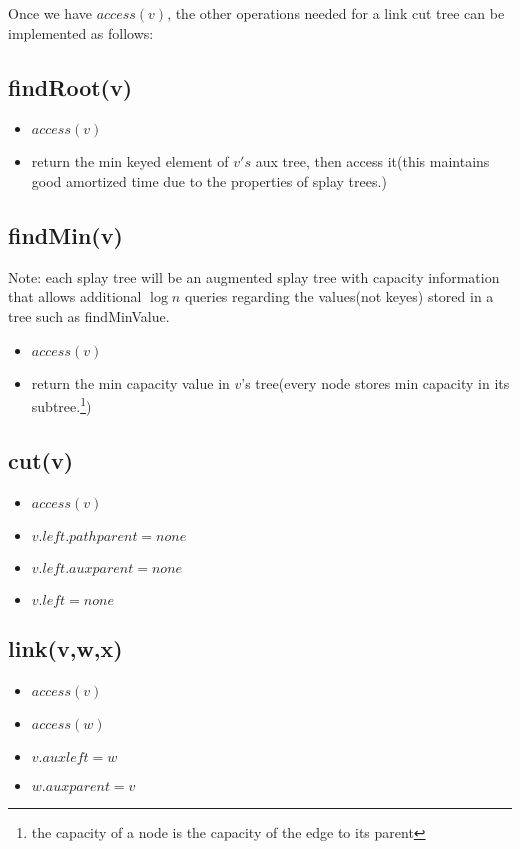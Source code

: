 \documentclass[11pt]{article}
\begin{document}
Once we have $access(v)$, the other operations needed for a link cut tree can be implemented as follows:
\subsection{findRoot(v)}
\begin{itemize}
	\item $access(v)$
	\item return the min keyed element of $v's$ aux tree, then access it(this maintains good amortized time due to the properties of splay trees.)
\end{itemize}


\subsection{findMin(v)}
Note: each splay tree will be an augmented splay tree with capacity information that allows additional $\log n$ queries regarding the values(not keyes) stored in a tree such as findMinValue. 
\begin{itemize}
	\item $access(v)$
	\item return the min capacity value in $v$'s tree(every node stores min capacity in its subtree.\footnote{the capacity of a node is the capacity of the edge to its parent})
\end{itemize}

\subsection{cut(v)}
\begin{itemize}
	\item $access(v)$
	\item $v.left.pathparent=none$
	\item $v.left.auxparent=none$
	\item $v.left=none$
\end{itemize}

\subsection{link(v,w,x)}
\begin{itemize}
	\item $access(v)$
	\item $access(w)$
	\item $v.auxleft=w$
	\item $w.auxparent=v$
\end{itemize}
\end{document}
